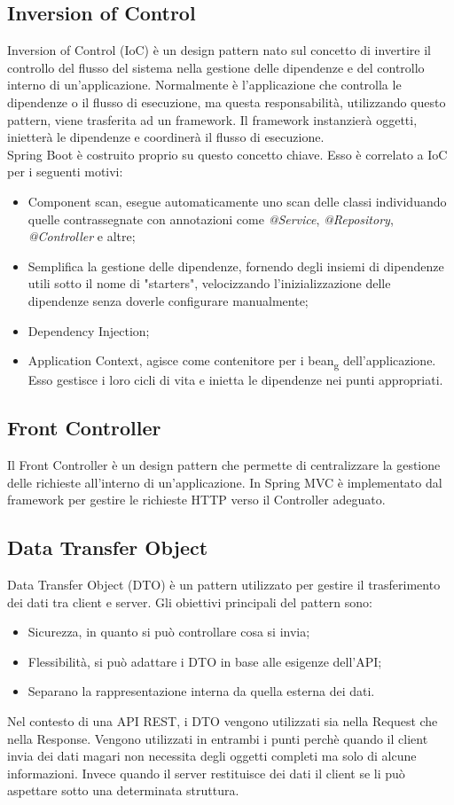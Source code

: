 \subsection*{Inversion of Control}
Inversion of Control (IoC) è un design pattern nato sul concetto di invertire il controllo del flusso del sistema nella gestione delle dipendenze e del controllo interno di un'applicazione. Normalmente è l'applicazione che controlla le dipendenze o il flusso di esecuzione, ma questa responsabilità, utilizzando questo pattern, viene trasferita ad un framework. Il framework instanzierà oggetti, inietterà le dipendenze e coordinerà il flusso di esecuzione.\\
Spring Boot è costruito proprio su questo concetto chiave. Esso è correlato a IoC per i seguenti motivi:
\begin{itemize}
\item Component scan, esegue automaticamente uno scan delle classi individuando quelle contrassegnate con annotazioni come \textit{@Service}, \textit{@Repository}, \textit{@Controller} e altre;
\item Semplifica la gestione delle dipendenze, fornendo degli insiemi di dipendenze utili sotto il nome di "starters", velocizzando l'inizializzazione delle dipendenze senza doverle configurare manualmente;
\item Dependency Injection;
\item Application Context, agisce come contenitore per i bean\textsubscript{g} dell'applicazione. Esso gestisce i loro cicli di vita e inietta le dipendenze nei punti appropriati.
\end{itemize}
\subsection*{Front Controller}
Il Front Controller è un design pattern che permette di centralizzare la gestione delle richieste all'interno di un'applicazione. In Spring MVC è implementato dal framework per gestire le richieste HTTP verso il Controller adeguato.
\subsection*{Data Transfer Object}
Data Transfer Object (DTO) è un pattern utilizzato per gestire il trasferimento dei dati tra client e server. Gli obiettivi principali del pattern sono:
\begin{itemize}
\item Sicurezza, in quanto si può controllare cosa si invia;
\item Flessibilità, si può adattare i DTO in base alle esigenze dell'API;
\item Separano la rappresentazione interna da quella esterna dei dati.
\end{itemize}
Nel contesto di una API REST, i DTO vengono utilizzati sia nella Request che nella Response. Vengono utilizzati in entrambi i punti perchè quando il client invia dei dati magari non necessita degli oggetti completi ma solo di alcune informazioni. Invece quando il server restituisce dei dati il client se li può aspettare sotto una determinata struttura.\\


